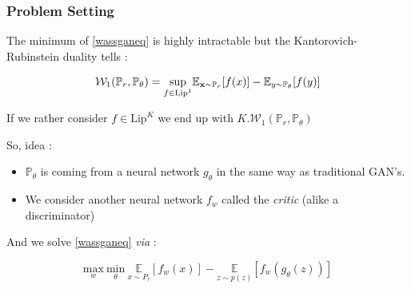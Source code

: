\documentclass[french,9pt]{beamer}
\newcommand{\x}{{\bf x}}
\begin{document}
\begin{frame}
\frametitle{Problem Setting \cite{arjovsky_wgan_2017}}

The minimum of \eqref{wassganeq} is highly intractable but the Kantorovich-Rubinstein duality tells :

$$\mathcal{W}_{1}(\mathbb{P}_{r},\mathbb{P}_{\theta})= \underset{f \in \text{Lip}^1}\sup  \mathbb{E}_{\x\sim  \mathbb{P}_{r}} [f(x)] - \mathbb{E}_{y \sim \mathbb{P}_{\theta} } [f(y)]$$

If we rather consider $f \in \text{Lip}^K$ we end up with $K.\mathcal{W}_{1}(\mathbb{P}_{r},\mathbb{P}_{\theta})$

So, idea :

\begin{itemize}
\item $\mathbb{P}_{\theta}$ is coming from a neural network $g_{\theta}$ in the same way as traditional GAN's.
\item We consider another neural network $f_{w}$ called the \emph{critic} (alike a discriminator)
\end{itemize}

And we solve \eqref{wassganeq} \textit{via} :

\begin{equation}
\label{wassgan}
\underset{w}{\text{max}} \ \underset{\theta}{\text{min}} \  \underset{x \sim P_{r}}{\mathbb{E}}[f_{w}(x)]-\underset{z \sim p(z)}{\mathbb{E}}[f_{w}(g_{\theta}(z))]
\end{equation}

\end{frame}

\end{document}

